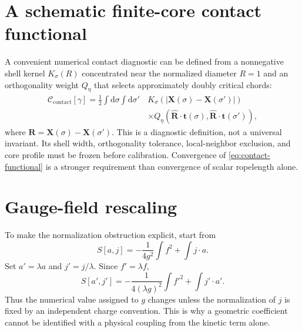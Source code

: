 \documentclass[aps,pre,preprint,notitlepage,nofootinbib,superscriptaddress]{revtex4-2}
\newcommand{\dd}{\mathrm d}
\newcommand{\calC}{\mathcal C}
\newcommand{\unitvec}[1]{\widehat{\bm #1}}
\begin{document}
\appendix

\section{A schematic finite-core contact functional}

A convenient numerical contact diagnostic can be defined from a nonnegative shell kernel $K_\sigma(R)$ concentrated near the normalized diameter $R=1$ and an orthogonality weight $Q_\eta$ that selects approximately doubly critical chords:
\begin{align}
  \calC_{\mathrm{contact}}[\gamma]
  =\frac12\int\!\dd\sigma\int\!\dd\sigma'\,
  &K_\sigma\!\left(|\bm X(\sigma)-\bm X(\sigma')|\right)\nonumber\\
  &\times Q_\eta\!\left(
  \unitvec{R}\cdot\bm t(\sigma),
  \unitvec{R}\cdot\bm t(\sigma')
  \right),
  \label{eq:contact-functional}
\end{align}
where $\bm R=\bm X(\sigma)-\bm X(\sigma')$.  This is a diagnostic definition, not a universal invariant.  Its shell width, orthogonality tolerance, local-neighbor exclusion, and core profile must be frozen before calibration.  Convergence of \cref{eq:contact-functional} is a stronger requirement than convergence of scalar ropelength alone.

\section{Gauge-field rescaling}

To make the normalization obstruction explicit, start from
\begin{equation}
  S[a,j]=-\frac{1}{4g^2}\int f^2+\int j\cdot a.
\end{equation}
Set $a'=\lambda a$ and $j'=j/\lambda$.  Since $f'=\lambda f$,
\begin{equation}
  S[a',j']=-\frac{1}{4(\lambda g)^2}\int f'^2+\int j'\cdot a'.
\end{equation}
Thus the numerical value assigned to $g$ changes unless the normalization of $j$ is fixed by an independent charge convention.  This is why a geometric coefficient cannot be identified with a physical coupling from the kinetic term alone.
\end{document}
